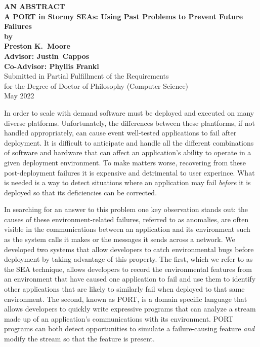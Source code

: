 \begin{center}

{\large\bf
   AN ABSTRACT\\[3ex]
   A PORT in Stormy SEAs: Using Past Problems to Prevent Future Failures\\[2ex]
   by\\[3ex]
   Preston K.\ Moore\\[3ex]
   Advisor: Justin\ Cappos\\[2ex]
   Co-Advisor: Phyllis Frankl
}\\[3ex]
Submitted in Partial Fulfillment of the Requirements\\[2ex]
for the Degree of Doctor of Philosophy (Computer Science)\\[3ex]
May 2022
\end{center}

\vspace*{2.5ex}


In order to scale with demand software must be deployed and executed on
many diverse platforms.
Unfortunately,
the differences between these plantforms,
if not handled appropriately,
can cause event well-tested applications to fail after deployment.
It is difficult to anticipate and handle all the different combinations of
software and hardware that can affect an application’s ability to operate
in a given deployment environment.
To make matters worse,
recovering from these post-deployment failures it is expensive and
detrimental to user experince.
What is needed is a way to detect situations where an application may fail
\textit{before} it is deployed so that its deficiencies can be corrected.

In searching for an answer to this problem one key observation stands out:
the causes of these environment-related failures,
referred to as anomalies,
are often visible in the
communications between an application and its environment such as the
system calls it makes or the messages it sends across a network.
We developed two systems that allow developers to catch environmental bugs
before deployment by taking advantage of this property.
The first,
which we refer to as the SEA technique,
allows developers to record the environmental features from an environment
that have caused one application to fail and use them to identify other
applications that are likely to similarly fail when deployed to that same
environment.
The second,
known as PORT,
is a domain specific language that allows developers
to quickly write expressive programs that can analyze a stream made up of
an application’s communications with its environment.
PORT programs can both detect opportunities to
simulate a failure-causing feature \textit{and} modify the stream so that
the feature is present.

